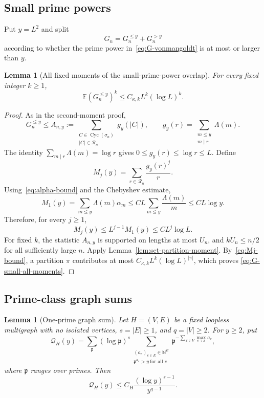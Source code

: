 \documentclass[11pt]{article}
\newtheorem{lemma}[theorem]{Lemma}
\theoremstyle{remark}
\newcommand{\Ee}{\mathbb E}
\newcommand{\Cyc}{\operatorname{Cyc}}
\begin{document}
\subsection{Small prime powers}

Put $y=L^2$ and split
\[
 G_n=G_n^{\le y}+G_n^{>y}
\]
according to whether the prime power in~\eqref{eq:G-vonmangoldt} is at most
or larger than $y$.

\begin{lemma}[All fixed moments of the small-prime-power overlap]
\label{lem:G-small-all-moments}
For every fixed integer $k\ge1$,
\begin{equation}
\label{eq:G-small-all-moments}
 \Ee(G_n^{\le y})^k
 \le C_{\kappa,k}L^k(\log L)^k.
\end{equation}
\end{lemma}

\begin{proof}
As in the second-moment proof,
\[
 G_n^{\le y}
 \le A_{n,y}:=
 \sum_{\substack{C\in\Cyc(\sigma_n)\\|C|\in\mathcal R_n}}g_y(|C|),
 \qquad
 g_y(r)=\sum_{\substack{m\le y\\m\mid r}}\Lambda(m).
\]
The identity $\sum_{m\mid r}\Lambda(m)=\log r$ gives
$0\le g_y(r)\le\log r\le L$.  Define
\[
 M_j(y)=\sum_{r\in\mathcal R_n}\frac{g_y(r)^j}{r}.
\]
Using~\eqref{eq:alpha-bound} and the Chebyshev estimate,
\[
 M_1(y)
 =\sum_{m\le y}\Lambda(m)\alpha_m
 \le CL\sum_{m\le y}\frac{\Lambda(m)}m
 \le CL\log y.
\]
Therefore, for every $j\ge1$,
\begin{equation}
\label{eq:Mj-bound}
 M_j(y)\le L^{j-1}M_1(y)\le C L^j\log L.
\end{equation}
For fixed $k$, the statistic $A_{n,y}$ is supported on lengths at most
$U_n$, and $kU_n\le n/2$ for all sufficiently large $n$.  Apply
Lemma~\ref{lem:set-partition-moment}.  By~\eqref{eq:Mj-bound}, a partition
$\pi$ contributes at most
$C_{\kappa,k}L^k(\log L)^{|\pi|}$, which proves
\eqref{eq:G-small-all-moments}.
\end{proof}

\subsection{Prime-class graph sums}

\begin{lemma}[One-prime graph sum]
\label{lem:one-prime-graph}
Let $H=(V,E)$ be a fixed loopless multigraph with no isolated vertices,
$s=|E|\ge1$, and $q=|V|\ge2$.  For $y\ge2$, put
\[
 \mathcal Q_H(y)
 =\sum_{\mathfrak p}(\log\mathfrak p)^s
 \sum_{\substack{(a_e)_{e\in E}\in\mathbb N^E\\
                   \mathfrak p^{a_e}>y\ \text{for all }e}}
 \mathfrak p^{-\sum_{x\in V}\max_{e\ni x}a_e},
\]
where $\mathfrak p$ ranges over primes.  Then
\begin{equation}
\label{eq:one-prime-graph}
 \mathcal Q_H(y)
 \le C_H\frac{(\log y)^{s-1}}{y^{q-1}}.
\end{equation}
\end{lemma}
\end{document}
